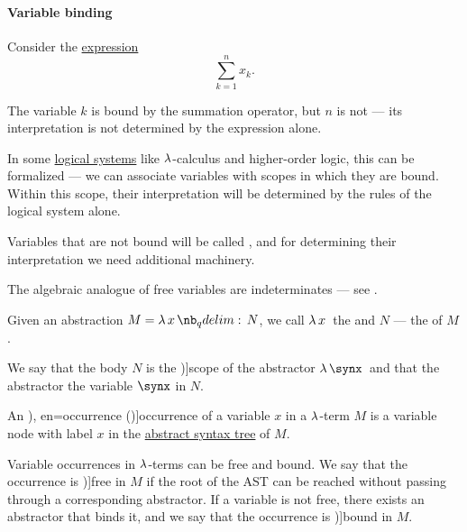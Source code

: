 \paragraph{Variable binding}

\begin{concept}\label{con:variable_binding}
  Consider the \hyperref[con:expression]{expression}
  \begin{equation*}
    \sum_{k=1}^n x_k.
  \end{equation*}

  The variable \( k \) is bound by the summation operator, but \( n \) is not --- its interpretation is not determined by the expression alone.

  In some \hyperref[con:logical_system]{logical systems} like \( \mathrm{\lambda} \)-calculus and higher-order logic, this can be formalized --- we can associate variables with scopes in which they are bound. Within this scope, their interpretation will be determined by the rules of the logical system alone.

  Variables that are not bound will be called , and for determining their interpretation we need additional machinery.
\end{concept}
\begin{comments}
  \item The algebraic analogue of free variables are indeterminates --- see .
\end{comments}

\begin{definition}\label{def:lambda_abstractor}
  Given an abstraction \( M = \qabs x N \), we call \( \qabs* x \) the  and \( N \) --- the  of \( M \).

  We say that the body \( N \) is the \term[ru=область действия (\cite[64]{Герасимов2011Вычислимость})]{scope} of the abstractor \( \quantifier* \synlambda \synx \) and that the abstractor  the variable \( \synx \) in \( N \).
\end{definition}

\begin{definition}\label{def:lambda_variable_occurrence}\mimprovised
  An \term[ru=вхождение (\cite[64]{Герасимов2011Вычислимость}), en=occurrence (\cite[9A2]{Hindley1997BasicSTT})]{occurrence} of a variable \( x \) in a \( \mathrm{\lambda} \)-term \( M \) is a variable node with label \( x \) in the \hyperref[def:lambda_term_ast]{abstract syntax tree} of \( M \).

  Variable occurrences in \( \mathrm{\lambda} \)-terms can be free and bound. We say that the occurrence is \term[ru=свободное (вхождение) (\cite[64]{Герасимов2011Вычислимость})]{free} in \( M \) if the root of the AST can be reached without passing through a corresponding abstractor. If a variable is not free, there exists an abstractor that binds it, and we say that the occurrence is \term[ru=связанное (вхождение) (\cite[64]{Герасимов2011Вычислимость})]{bound} in \( M \).
\end{definition}

